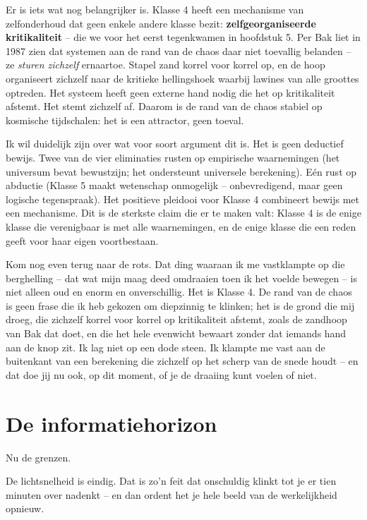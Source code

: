 \documentclass[11pt, twoside, openright]{book}
\begin{document}
Er is iets wat nog belangrijker is. Klasse 4 heeft een mechanisme van zelfonderhoud dat geen enkele andere klasse bezit: \textbf{zelfgeorganiseerde kritikaliteit} -- die we voor het eerst tegenkwamen in hoofdstuk 5. Per Bak liet in 1987 zien dat systemen aan de rand van de chaos daar niet toevallig belanden -- ze \textit{sturen zichzelf} ernaartoe. Stapel zand korrel voor korrel op, en de hoop organiseert zichzelf naar de kritieke hellingshoek waarbij lawines van alle groottes optreden. Het systeem heeft geen externe hand nodig die het op kritikaliteit afstemt. Het stemt zichzelf af. Daarom is de rand van de chaos stabiel op kosmische tijdschalen: het is een attractor, geen toeval.

Ik wil duidelijk zijn over wat voor soort argument dit is. Het is geen deductief bewijs. Twee van de vier eliminaties rusten op empirische waarnemingen (het universum bevat bewustzijn; het ondersteunt universele berekening). Eén rust op abductie (Klasse 5 maakt wetenschap onmogelijk -- onbevredigend, maar geen logische tegenspraak). Het positieve pleidooi voor Klasse 4 combineert bewijs met een mechanisme. Dit is de sterkste claim die er te maken valt: Klasse 4 is de enige klasse die verenigbaar is met alle waarnemingen, en de enige klasse die een reden geeft voor haar eigen voortbestaan.

Kom nog even terug naar de rots. Dat ding waaraan ik me vastklampte op die berghelling -- dat wat mijn maag deed omdraaien toen ik het voelde bewegen -- is niet alleen oud en enorm en onverschillig. Het is Klasse 4. De rand van de chaos is geen frase die ik heb gekozen om diepzinnig te klinken; het is de grond die mij droeg, die zichzelf korrel voor korrel op kritikaliteit afstemt, zoals de zandhoop van Bak dat doet, en die het hele evenwicht bewaart zonder dat iemands hand aan de knop zit. Ik lag niet op een dode steen. Ik klampte me vast aan de buitenkant van een berekening die zichzelf op het scherp van de snede houdt -- en dat doe jij nu ook, op dit moment, of je de draaiing kunt voelen of niet.


\section*{De informatiehorizon}

Nu de grenzen.

De lichtsnelheid is eindig. Dat is zo'n feit dat onschuldig klinkt tot je er tien minuten over nadenkt -- en dan ordent het je hele beeld van de werkelijkheid opnieuw.
\end{document}
